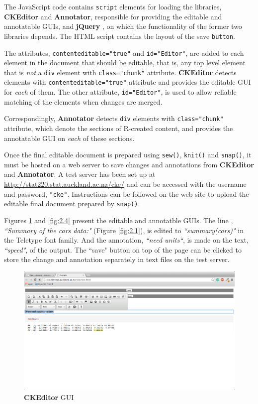 \documentclass[a4paper, 12pt]{report}
\begin{document}
The JavaScript code contains \texttt{script} elements for loading the libraries, \textbf{CKEditor} and \textbf{Annotator}, responsible for providing the editable and annotatable GUIs, and \textbf{jQuery} \citep{jquery}, on which the functionality of the former two libraries depends. The HTML script contains the layout of the save \texttt{button}.

The attributes, \texttt{contenteditable="true"} and \texttt{id="Editor"}, are added to each element in the document that should be editable, that is, any top level element that is \emph{not} a \texttt{div} element with \texttt{class="chunk"} attribute. \textbf{CKEditor} detects elements with \texttt{contenteditable="true"} attribute and provides the editable GUI for \emph{each} of them. The other attribute, \texttt{id="Editor"}, is used to allow reliable matching of the elements when changes are merged.

Correspondingly, \textbf{Annotator} detects \texttt{div} elements with \texttt{class="chunk"} attribute, which denote the sections of R-created content, and provides the annotatable GUI on \emph{each} of these sections.

Once the final editable document is prepared using \texttt{sew()}, \texttt{knit()} and \texttt{snap()}, it must be hosted on a web server to save changes and annotations from \textbf{CKEditor} and \textbf{Annotator}. A test server has been set up at \url{http://stat220.stat.auckland.ac.nz/cke/} and can be accessed with the username and password, \texttt{"cke"}. Instructions can be followed on the web site to upload the editable final document prepared by \texttt{snap()}.

Figures \ref{fig:2.3} and \ref{fig:2.4} present the editable and annotatble GUIs. The line , \emph{``Summary of the cars data:"} (Figure \ref{fig:2.1}), is edited to \emph{``summary(cars)"} in the Teletype font family. And the annotation, \emph{``need units``}, is made on the text, \emph{``speed"}, of the output. The ``save" button on top of the page can be clicked to store the change and annotation separately in text files on the test server.
\begin{figure}[h]  %
\includegraphics[trim=0cm 14cm 3cm 3.5cm,clip=true,width=1\textwidth,center]{changes}
\caption{\textbf{CKEditor} GUI}
\label{fig:2.3}
\end{figure}
\end{document}
